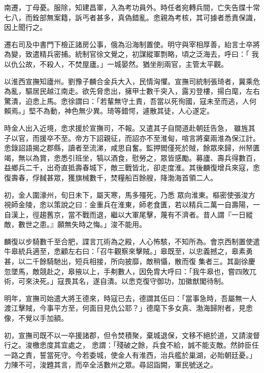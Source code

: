 \begin{pinyinscope}
 南遷，丁母憂。服除，知建昌軍，入為考功員外。時任者宛轉兵間，亡失告牒十常七八，而銓部無案籍，訴丐者甚多，真偽錯亂。悆親為考核，其可據者悉責保識，因上聞行之。



 遷右司及中書門下檢正諸房公事，俄為沿海制置使。明守與宰相厚善，紿言士卒將為變，致遣精兵密捕。統制官徐文覺之，初謀縱軍剽略，頃之泛海去，呼曰：「
 我以仇公故，不殺人，不焚屋廬。」一城晏然。猶坐削兩官，主管太平觀。



 以淮西宣撫知廬州。劉豫子麟合金兵大入，民情洶懼。宣撫司統制張琦者，冀乘危為亂，驅居民越江南走。欲先脅悆出，擁甲士數千突入，露刃登樓，揚白麾，左右驚潰，迫悆上馬。悆徐謂曰：「若輩無守土責，吾當以死徇國，寇未至而逃，人何賴焉。」堅不為動，神色無少異。琦等錯愕，遽散其徒，人心遂定。



 時金人出入近境，悆求援於宣撫司，不報。又遣其子自間道赴朝廷告急，
 雖旌其子以官，而援卒不至。帝方下詔親征，而詔亦不至淮甸，喧言將棄兩淮為保江計。悆錄詔語揭之郡縣，讀者至流涕，咸思自奮。監押閻僅死於賊，餘眾來歸，州帑匱竭，無以為賞，悆悉引班坐，犒以酒食，慰勞之，眾皆感勵。募廬、壽兵得數百，益鄉兵二千，出奇直抵壽春城下，敵三戰皆北，卻走度淮。其後麟復增兵來寇，悆復壽春，俘馘甚眾，獲旗械數千，焚糧船百餘艘，降渤海首領二人。



 初，金人圍濠州，旬日未下，屬天寒，馬多殭死，乃悉
 眾向淮東。樞密使張浚方視師金陵，悆以策說之曰：金重兵在淮東，師老食匱，若以精兵二萬一自壽陽，一自漢上，徑趨舊京，當不戰而退，繼以大軍尾擊，蔑有不濟者。昔人謂『一日縱敵，數世之患。』願無失時之悔。」浚不能用。



 麟復以步騎數千至合肥，諜言兀術為之殿，人心怖駭，不知所為。會京西制置使遣牛皋統兵適至，悆顧左右曰：「召牛觀察來擊賊。」皋既至，以忠義撼之，皋素勇甚，以二千餘騎馳出，短兵相接，所向披靡，敵稍懾，散而復
 集者三。其副徐慶忽墜馬，敵競赴之，皋掖以上，手刜數人，因免胄大呼曰：「我牛皋也，嘗四敗兀術，可來決死。」寇畏其名，遂自潰。以悆克復守御功，加徽猷閣待制。



 明年，宣撫司始遣大將王德來，時寇已去，德謂其伍曰：「當事急時，吾屬無一人渡江擊賊，今事平方至，何面目見仇公耶？」德麾下多女真、渤海歸附者，見悆像，不覺以手加額。



 初，宣撫司既不以一卒援諸郡，但令焚積聚，棄城退保，文移不絕於道，又請浚督行之。浚檄悆度其宜處之，
 悆謂：「殘破之餘，兵食不給，誠不能支敵。然帥臣任一路之責，誓當死守。今若委城，使金人有淮西，治兵艦於巢湖，必貽朝廷憂。」力陳不可，浚韙其言，而卒全活數州之眾。尋詔詣闕，軍民號送之。




\end{pinyinscope}
